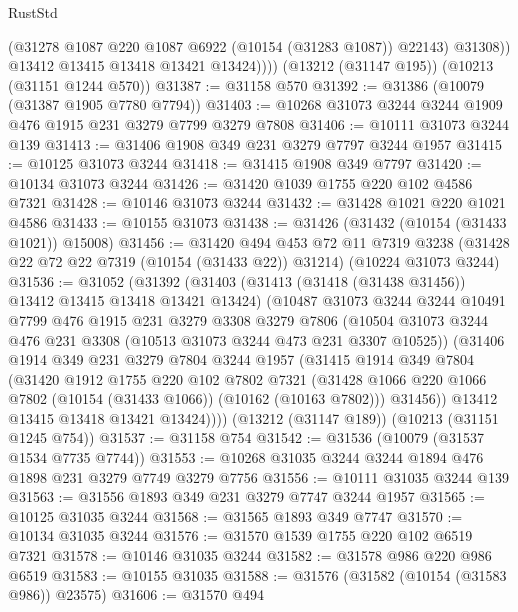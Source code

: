 \begin{lexlean}{RustStd}
\begin{coremodule}
{\begin{coremodule}
{{{{{{{{{{{{{{{{{{{{{{{{{{                (@31278 @1087 @220 @1087 @6922 (@10154 (@31283 @1087)) @22143)
                @31308))
            @13412
            @13415
            @13418
            @13421
            @13424))))
    (@13212 (@31147 @195))
    (@10213 (@31151 @1244 @570))
@31387 := @31158 @570
@31392 := @31386 (@10079 (@31387 @1905 @7780 @7794))
@31403 := @10268 @31073 @3244 @3244 @1909 @476 @1915 @231 @3279 @7799 @3279 @7808
@31406 := @10111 @31073 @3244 @139
@31413 := @31406 @1908 @349 @231 @3279 @7797 @3244 @1957
@31415 := @10125 @31073 @3244
@31418 := @31415 @1908 @349 @7797
@31420 := @10134 @31073 @3244
@31426 := @31420 @1039 @1755 @220 @102 @4586 @7321
@31428 := @10146 @31073 @3244
@31432 := @31428 @1021 @220 @1021 @4586
@31433 := @10155 @31073
@31438 := @31426 (@31432 (@10154 (@31433 @1021)) @15008)
@31456 := @31420
    @494
    @453
    @72
    @11
    @7319
    @3238
    (@31428 @22 @72 @22 @7319 (@10154 (@31433 @22)) @31214)
    (@10224 @31073 @3244)
@31536 := @31052
    (@31392
      (@31403
        (@31413 (@31418 (@31438 @31456)) @13412 @13415 @13418 @13421 @13424)
        (@10487
          @31073
          @3244
          @3244
          @10491
          @7799
          @476
          @1915
          @231
          @3279
          @3308
          @3279
          @7806
          (@10504 @31073 @3244 @476 @231 @3308 (@10513 @31073 @3244 @473 @231 @3307 @10525))
          (@31406
            @1914
            @349
            @231
            @3279
            @7804
            @3244
            @1957
            (@31415
              @1914
              @349
              @7804
              (@31420
                @1912
                @1755
                @220
                @102
                @7802
                @7321
                (@31428 @1066 @220 @1066 @7802 (@10154 (@31433 @1066)) (@10162 (@10163 @7802)))
                @31456))
            @13412
            @13415
            @13418
            @13421
            @13424))))
    (@13212 (@31147 @189))
    (@10213 (@31151 @1245 @754))
@31537 := @31158 @754
@31542 := @31536 (@10079 (@31537 @1534 @7735 @7744))
@31553 := @10268 @31035 @3244 @3244 @1894 @476 @1898 @231 @3279 @7749 @3279 @7756
@31556 := @10111 @31035 @3244 @139
@31563 := @31556 @1893 @349 @231 @3279 @7747 @3244 @1957
@31565 := @10125 @31035 @3244
@31568 := @31565 @1893 @349 @7747
@31570 := @10134 @31035 @3244
@31576 := @31570 @1539 @1755 @220 @102 @6519 @7321
@31578 := @10146 @31035 @3244
@31582 := @31578 @986 @220 @986 @6519
@31583 := @10155 @31035
@31588 := @31576 (@31582 (@10154 (@31583 @986)) @23575)
@31606 := @31570
    @494
}}}}}}}}}}}}}}}}}}}}}}}}}}
\end{coremodule}}
\end{coremodule}
\end{lexlean}
